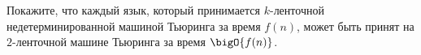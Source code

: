 Покажите, что каждый язык, который принимается $k$-ленточной недетерминированной машиной Тьюринга за
время $f(n)$, может быть принят на $2$-ленточной машине Тьюринга за время $\bigO{f(n)}$.
